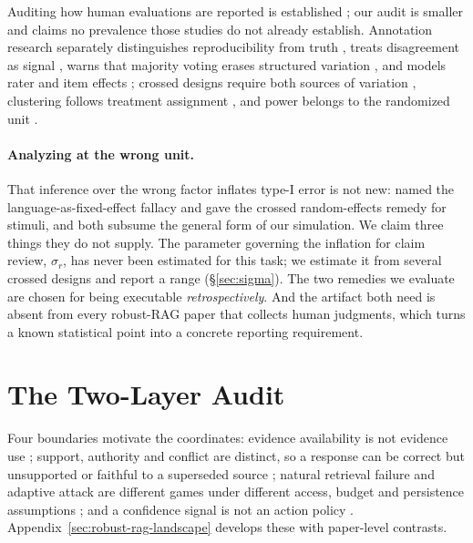 \documentclass[11pt]{article}
\begin{document}
Auditing how human evaluations are reported is established
\citep{howcroft2020twenty,vanderlee2021human,belz2021systematic,
belz2023impossibility,clark2021human}; our audit is smaller and claims no
prevalence those studies do not already establish. Annotation research
separately distinguishes reproducibility from truth
\citep{artstein2008intercoder,dawid1979observer}, treats disagreement as signal
\citep{uma2021disagreement}, warns that majority voting erases structured
variation \citep{plank2022labelvariation,davani2022disagreements}, and models
rater and item effects \citep{passonneau2014annotation,paun2018bayesian};
crossed designs require both sources of variation \citep{baayen2008crossed},
clustering follows treatment assignment \citep{abadie2023clustering}, and power
belongs to the randomized unit
\citep{card2020power,vanmiltenburg2021preregistering}.

\paragraph{Analyzing at the wrong unit.}
That inference over the wrong factor inflates type-I error is not new:
\citet{clark1973language} named the language-as-fixed-effect fallacy and
\citet{judd2012stimuli} gave the crossed random-effects remedy for stimuli, and
both subsume the general form of our simulation. We claim three things they do
not supply. The parameter governing the inflation for claim review, $\sigma_r$,
has never been estimated for this task; we estimate it from several crossed
designs and report a range (\S\ref{sec:sigma}). The two remedies we evaluate
are chosen for being executable \emph{retrospectively}. And the artifact both
need is absent from every robust-RAG paper that collects human judgments, which
turns a known statistical point into a concrete reporting requirement.

\section{The Two-Layer Audit}
\label{sec:estimands}

Four boundaries motivate the coordinates: evidence availability is not evidence
use \citep{irrelevantContext2023,raat2024,rgb2023,chainOfNote2023}; support,
authority and conflict are distinct, so a response can be correct but
unsupported or faithful to a superseded source
\citep{ragTruth2024,astuteRAG2025,freshllms2024}; natural retrieval failure and
adaptive attack are different games under different access, budget and
persistence assumptions \citep{poisonedRAG2024,phantom2024,certifiedRAG2024};
and a confidence signal is not an action policy
\citep{guo2017calibration,geifman2017selective,selfRAG2023,crag2024,
sufficientContext2024}. Appendix~\ref{sec:robust-rag-landscape} develops these
with paper-level contrasts.
\end{document}
